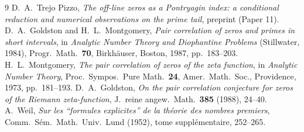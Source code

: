 \documentclass[11pt]{amsart}
\theoremstyle{definition}
\theoremstyle{remark}
\begin{document}
\begin{thebibliography}{9}
 D.~A.~Trejo Pizzo, \emph{The off-line zeros as a Pontryagin index: a conditional reduction and numerical observations on the prime tail}, preprint (Paper 11).
 D.~A.~Goldston and H.~L.~Montgomery, \emph{Pair correlation of zeros and primes in short intervals}, in \emph{Analytic Number Theory and Diophantine Problems} (Stillwater, 1984), Progr.\ Math.\ \textbf{70}, Birkh\"auser, Boston, 1987, pp.~183--203.
 H.~L.~Montgomery, \emph{The pair correlation of zeros of the zeta function}, in \emph{Analytic Number Theory}, Proc.\ Sympos.\ Pure Math.\ \textbf{24}, Amer.\ Math.\ Soc., Providence, 1973, pp.~181--193.
 D.~A.~Goldston, \emph{On the pair correlation conjecture for zeros of the Riemann zeta-function}, J.\ reine angew.\ Math.\ \textbf{385} (1988), 24--40.
 A.~Weil, \emph{Sur les ``formules explicites'' de la th\'eorie des nombres premiers}, Comm.\ S\'em.\ Math.\ Univ.\ Lund (1952), tome suppl\'ementaire, 252--265.
\end{thebibliography}
\end{document}
